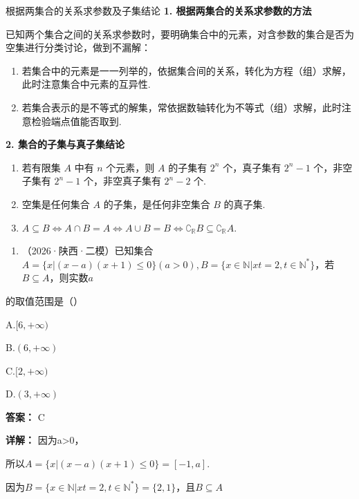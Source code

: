 \documentclass[11pt,a4paper]{ctexart}
\begin{document}
\begin{methodbox}{根据两集合的关系求参数及子集结论}
  \textbf{1. 根据两集合的关系求参数的方法}
  
  已知两个集合之间的关系求参数时，要明确集合中的元素，对含参数的集合是否为空集进行分类讨论，做到不漏解：

\begin{enumerate}[label=(\arabic*), leftmargin=*]
    \item 若集合中的元素是一一列举的，依据集合间的关系，转化为方程（组）求解，此时注意集合中元素的互异性.
    \item 若集合表示的是不等式的解集，常依据数轴转化为不等式（组）求解，此时注意检验端点值能否取到.
  \end{enumerate}

  \vspace{0.5em}
  \textbf{2. 集合的子集与真子集结论}
  

\begin{enumerate}[label=(\arabic*), leftmargin=*]
    \item 若有限集 $A$ 中有 $n$ 个元素，则 $A$ 的子集有 $2^n$ 个，真子集有 $2^n - 1$ 个，非空子集有 $2^n - 1$ 个，非空真子集有 $2^n - 2$ 个.
    \item 空集是任何集合 $A$ 的子集，是任何非空集合 $B$ 的真子集.
    \item \(A \subseteq B \Leftrightarrow A \cap B = A \Leftrightarrow A \cup B = B \Leftrightarrow \complement_{\mathbb{R}} B \subseteq \complement_{\mathbb{R}} A.\)
  \end{enumerate}
\end{methodbox}

\begin{enumerate}[label=\arabic*., leftmargin=*]
\item （2026·陕西·二模）已知集合\(A = \{x|(x - a)(x + 1) \leq 0\}(a > 0), B = \{x \in \mathbb{N} | xt = 2, t \in \mathbb{N}^{*}\}\)，若\(B \subseteq A\)，则实数\(a\)
\end{enumerate}

的取值范围是（）

A.\([6,+\infty)\)

B.\((6,+\infty)\)

C.\([2,+\infty)\)

D.\((3,+\infty)\)

\textbf{答案：}
C

\textbf{详解：}
因为a\textgreater0，

所以\(A = \{x|(x - a)(x + 1)\leq 0\} = [-1,a].\)

因为\(B = \{x \in \mathbb{N} | xt = 2, t \in \mathbb{N}^{*}\} = \{2,1\}\)，且\(B \subseteq A\)
\end{document}
